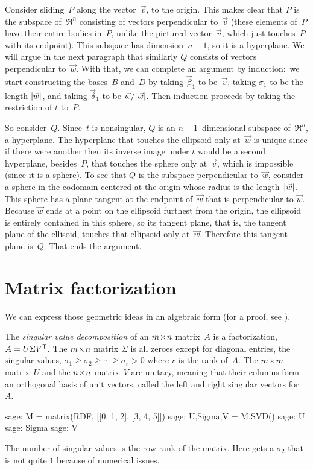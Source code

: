 Consider sliding~$P$ along the vector~$\vec{v}$, to the origin.
This makes clear that $P$ is the subspace of~$\Re^n$
consisting of vectors perpendicular
to~$\vec{v}$ (these elements of~$P$ have their
entire bodies in~$P$, 
unlike the pictured vector~$\vec{v}$, which just touches~$P$ with its endpoint).
This subspace has dimension~$n-1$, so it is a hyperplane. 
We will argue in the next paragraph 
that similarly $Q$ consists of
vectors perpendicular to~$\vec{w}$.
With that, we can complete an argument by induction:~we 
start constructing the 
bases~$B$ and~$D$ by taking $\vec{\beta}_1$ to be~$\vec{v}$, taking
$\sigma_1$ to be the length $\lvert\vec{w}\rvert$, and taking
$\vec{\delta}_1$ to be $\vec{w}/\lvert\vec{w}\rvert$.
Then induction proceeds by taking the restriction of $t$ to~$P$.

So consider~$Q$.
Since~$t$ is nonsingular, $Q$ is an $n-1$~dimensional subspace of~$\Re^n$,
a hyperplane.
The hyperplane that touches the ellipsoid
only at~$\vec{w}$ is unique since if there were another then its inverse image
under $t$
would be a second hyperplane, besides~$P$, 
that touches the sphere only at~$\vec{v}$, which is impossible (since it is a
sphere).
To see that $Q$ is the subspace
perpendicular to~$\vec{w}$, consider a sphere in the codomain
centered at the origin whose radius is the length~$\lvert\vec{w}\rvert$.
This sphere has a plane tangent at the endpoint of~$\vec{w}$ 
that is perpendicular
to $\vec{w}$.
Because $\vec{w}$ ends at a point on the ellipsoid furthest from the origin,
the ellipsoid is entirely contained in this sphere, so its tangent plane,
that is, the tangent plane of the ellisoid,
touches that ellipsoid only at~$\vec{w}$.
Therefore
this tangent plane is~$Q$. 
That ends the argument.



\section{Matrix factorization}

We can express those geometric ideas in an algebraic form
(for a proof, see \cite{TrefethenBau97}).

The \textit{singular value decomposition} of an $m \! \times \! n$ matrix~$A$
is a factorization, $A=U\Sigma {{V}^{\mathsf{T}}}$\!.
The $m \! \times \! n$ matrix $\Sigma$ 
is all zeroes except for diagonal entries, the singular values, 
$\sigma_1\geq \sigma_2 \geq \cdots \geq \sigma_r> 0$ where $r$ is the
rank of~$A$.
The $m \! \times \! m$ matrix~$U$ and the $n \! \times \! n$ matrix~$V$ are unitary, meaning
that their columns form an orthogonal basis of unit vectors, called 
the left and 
right singular vectors for~$A$. 
\begin{sagecommandline}
sage: M = matrix(RDF, [[0, 1, 2], [3, 4, 5]])
sage: U,Sigma,V = M.SVD()
sage: U
sage: Sigma
sage: V  
\end{sagecommandline}
The number of singular values is the row rank of the matrix.
Here \Sage{} gets a $\sigma_2$ that is not quite \( 1 \) because of numerical 
issues. 

